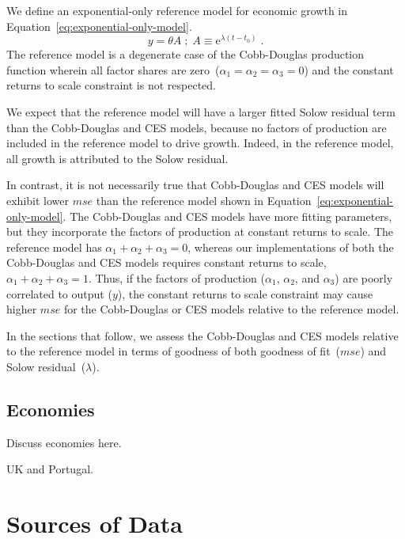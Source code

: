 \documentclass[preprint,authoryear,12pt]{elsarticle}\usepackage[]{graphicx}\usepackage[]{color}
\begin{document}
We define an exponential-only reference model for economic growth
in Equation~\ref{eq:exponential-only-model}.
%
\begin{equation} \label{eq:exponential-only-model}
  y = \theta A \; ; \; A \equiv \mathrm{e}^{\lambda(t-t_0)} \; .
\end{equation}
%
The reference model is a degenerate case of the Cobb-Douglas production function
wherein all factor shares are zero~($\alpha_1 = \alpha_2 = \alpha_3 = 0$)
and the constant returns to scale constraint is not respected.

We expect that the reference model will have a larger fitted Solow residual term than
the Cobb-Douglas and CES models, because no factors of production are
included in the reference model to drive growth.
Indeed, in the reference model, 
all growth is attributed to the Solow residual.

In contrast, it is not necessarily true that 
Cobb-Douglas and CES models 
will exhibit lower $mse$ than the reference model
shown in Equation~\ref{eq:exponential-only-model}.
The Cobb-Douglas and CES models have more fitting parameters,
but they incorporate the factors of production
at constant returns to scale. 
The reference model has $\alpha_1 + \alpha_2 + \alpha_3 = 0$,
whereas our implementations of both the Cobb-Douglas and CES models
requires constant returns to scale, $\alpha_1 + \alpha_2 + \alpha_3 = 1$.
Thus, if the factors of production ($\alpha_1$, $\alpha_2$, and $\alpha_3$) 
are poorly correlated to output ($y$),
the constant returns to scale constraint may cause higher $mse$ for
the Cobb-Douglas or CES models relative to the reference model.

In the sections that follow, 
we assess the Cobb-Douglas and CES models relative to the reference model
in terms of goodness of both goodness of fit~($mse$) and Solow residual~($\lambda$).


\subsection{Economies} 
\label{sec:Economies}

Discuss economies here.

UK and Portugal.


\section{Sources of Data}
\label{sec:Sources_of_Data}
\end{document}
